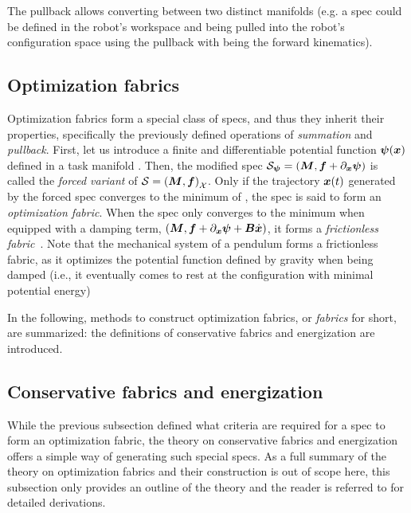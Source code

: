 The pullback allows converting between two distinct
manifolds (e.g. a spec could be defined in the robot's
workspace and being pulled into the robot's configuration
space using the pullback with \map{} being the forward
kinematics).

\subsection{Optimization fabrics}%
\label{sub:optimization_fabrics}

Optimization fabrics form a special class of specs, and thus they inherit their properties,
specifically the previously defined operations of \textit{summation} and \textit{pullback}.
First, let us introduce a finite and differentiable potential
function $\bm{\psi}(\bm{x})$ defined in a task manifold \X{}. 
Then, the modified spec $\mathcal{S}_{\bm{\psi}} = \left(\bm{M},\bm{f} + \partial_{\bm{x}}\bm{\psi}\right)$
is called the \textit{forced variant} of $\mathcal{S} = \left(\bm{M},\bm{f}\right)_{\mathcal{X}}$.
Only if the trajectory $\bm{x}(t)$ generated by the forced spec converges to the minimum of \forc{}, 
the spec is said to form an \textit{optimization fabric}.
When the spec only converges to the minimum when equipped with a damping term,
$\left(\bm{M},\bm{f} + \partial_{\bm{x}}\bm{\psi} + \bm{B}\dot{\bm{x}}\right)$, 
it forms a \textit{frictionless fabric}~\cite[Definition 4.4]{Ratliff2020}. 
Note that the mechanical system of a pendulum forms a frictionless fabric, as it optimizes
the potential function defined by gravity when being damped (i.e., it eventually comes to
rest at the configuration with minimal potential energy)

In the following, methods to construct optimization fabrics, or \textit{fabrics} for
short, are summarized: the definitions of conservative fabrics and energization are
introduced.

\subsection{Conservative fabrics and energization}%
\label{sub:conservative_fabrics_and_energization}

While the previous subsection defined what criteria are required for a spec to form
an optimization fabric, the theory on conservative fabrics and energization 
offers a simple way of generating such special specs. As a full summary of the theory
on optimization fabrics and their construction is out of scope here, this
subsection only provides an outline of the theory and the reader is referred to 
\cite{Ratliff2021,Wyk2022} for detailed derivations.

